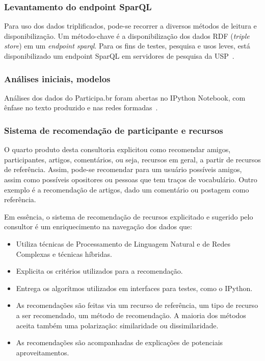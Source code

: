 \documentclass[12pt]{article}
\begin{document}
\subsubsection{Levantamento do endpoint SparQL}\label{sec:sfoo}
Para uso dos dados triplificados, pode-se recorrer a diversos métodos de leitura e disponibilização. Um método-chave é a disponibilização dos dados RDF (\emph{triple store}) em um \emph{endpoint sparql}. Para os fins de testes, pesquisa e usos leves, está disponibilizado um endpoint SparQL em servidores de pesquisa da USP~\cite{endpoint}.
\subsubsection{Análises iniciais, modelos}
Análises dos dados do Participa.br foram abertas no IPython Notebook, com ênfase no texto produzido e nas redes formadas~\cite{repoProd3}.
\subsubsection{Sistema de recomendação de participante e recursos}
O quarto produto desta consultoria explicitou como recomendar amigos, participantes, artigos, comentários, ou seja, recursos em geral, a partir de recursos de referência. Assim, pode-se recomendar para um usuário possíveis amigos, assim como possíveis opositores ou pessoas que tem traços de vocabulário. Outro exemplo é a recomendação de artigos, dado um comentário ou postagem como referência.

Em essência, o sistema de recomendação de recursos explicitado e sugerido pelo consultor é um enriquecimento na navegação dos dados que:
\begin{itemize}
    \item Utiliza técnicas de Processamento de Linguagem Natural e de Redes Complexas e técnicas híbridas.
    \item Explicita os critérios utilizados para a recomendação.
    \item Entrega os algorítmos utilizados em interfaces para testes, como o IPython.
    \item As recomendações são feitas via um recurso de referência, um tipo de recurso a ser recomendado, um método de recomendação. A maioria dos métodos aceita também uma polarização: similaridade ou dissimilaridade.
    \item As recomendações são acompanhadas de explicações de potenciais aproveitamentos.
\end{itemize}
\end{document}
